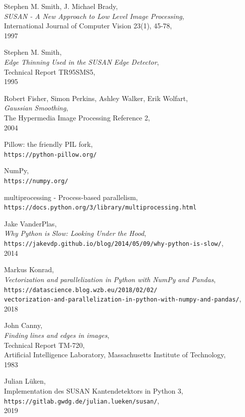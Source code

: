 \documentclass[a4paper, 11pt]{report}
\renewcommand{\emph}[1]{\textit{#1}}
\theoremstyle{definition}
\begin{document}
\begin{thebibliography}{56}
	Stephen M. Smith, J. Michael Brady,\\
	\textit{SUSAN - A New Approach to Low Level Image Processing},\\
	International Journal of Computer Vision 23(1), 45-78,\\
	1997

	Stephen M. Smith,\\
	\textit{Edge Thinning Used in the SUSAN Edge Detector},\\
	Technical Report TR95SMS5,\\
	1995

	Robert Fisher, Simon Perkins, Ashley Walker, Erik Wolfart,\\
	\textit{Gaussian Smoothing},\\
	The Hypermedia Image Processing Reference 2,\\
	2004
	
	Pillow: the friendly PIL fork, \\
	\texttt{https://python-pillow.org/}

	NumPy,\\
	\texttt{https://numpy.org/}

	multiprocessing - Process-based parallelism, \\
	\texttt{https://docs.python.org/3/library/multiprocessing.html}

	Jake VanderPlas,\\
	\textit{Why Python is Slow: Looking Under the Hood},\\
	\texttt{https://jakevdp.github.io/blog/2014/05/09/why-python-is-slow/},\\
	2014

	Markus Konrad,\\
	\textit{Vectorization and parallelization in Python with NumPy and Pandas},\\
	\texttt{https://datascience.blog.wzb.eu/2018/02/02/\\
	vectorization-and-parallelization-in-python-with-numpy-and-pandas/},\\
	2018

	John Canny,\\
	\emph{Finding lines and edges in images},\\
	Technical Report TM-720,\\
	Artificial Intelligence Laboratory, Massachusetts Institute of Technology,\\
	1983

	Julian Lüken,\\
	Implementation des SUSAN Kantendetektors in Python 3,\\
	\texttt{https://gitlab.gwdg.de/julian.lueken/susan/},\\
	2019

\end{thebibliography}
\pagebreak
\end{document}
